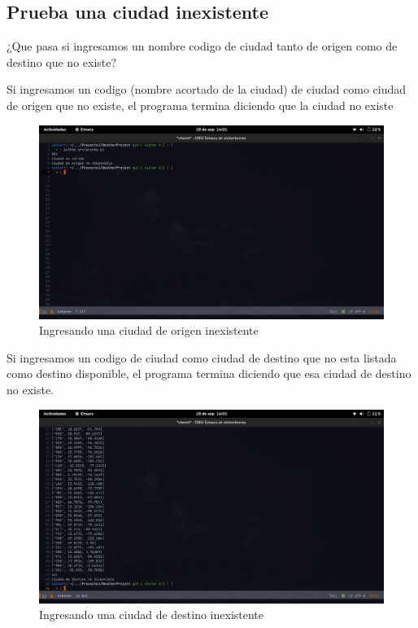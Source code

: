 \documentclass[12pt]{article}
\begin{document}
\subsection{Prueba una ciudad inexistente}
¿Que pasa si ingresamos un nombre codigo de ciudad tanto de origen como de destino que no existe?

Si ingresamos un codigo (nombre acortado de la ciudad) de ciudad como ciudad de origen que no existe, el programa termina diciendo que la ciudad no existe
\begin{figure}[h!]
  \centering
  \includegraphics[scale=0.3]{figures/ciudadOmal}
  \caption{Ingresando una ciudad de origen inexistente}
\end{figure}

Si ingresamos un codigo de ciudad como ciudad de destino que no esta listada como destino disponible, el programa termina diciendo que esa ciudad de destino no existe.
\begin{figure}[ht]
  \centering
  \includegraphics[scale=0.3]{figures/ciudadDmal}
  \caption{Ingresando una ciudad de destino inexistente}
\end{figure}
\end{document}
